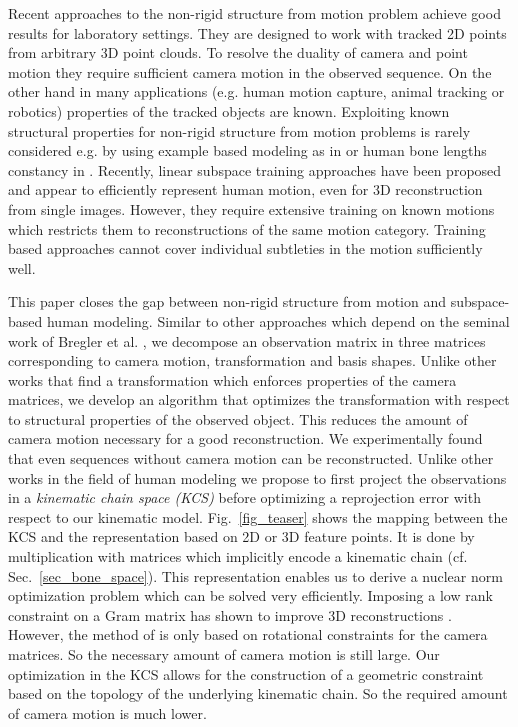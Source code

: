 \documentclass[10pt,letterpaper]{article}
\begin{document}
Recent approaches to the non-rigid structure from motion problem \cite{akhter2011trajectory,gotardo12,li12,Rehan2014} achieve good results for laboratory settings. They are designed to work with tracked 2D points from arbitrary 3D point clouds. To resolve the duality of camera and point motion they require  sufficient camera motion in the observed sequence. On the other hand in many applications (e.g. human motion capture, animal tracking or robotics) properties of the tracked objects are known. Exploiting known structural properties for non-rigid structure from motion problems is rarely considered e.g. by using example based modeling as in \cite{ChenC09} or human bone lengths constancy in \cite{Wandt2016}. Recently, linear subspace training approaches have been proposed \cite{Ramakrishna12,Wang2014,Akhter2015,ZhouConvexRelax2015,Wandt2016} and appear to efficiently represent human motion, even for 3D reconstruction from single images. However, they require extensive training on known motions which restricts them to reconstructions of the same motion category. Training based approaches cannot cover individual subtleties in the motion sufficiently well.

This paper closes the gap between non-rigid structure from motion and subspace-based human modeling. Similar to other approaches which depend on the seminal work of Bregler et al. \cite{Bregler2000}, we decompose an observation matrix in three matrices corresponding to camera motion, transformation and basis shapes. Unlike other works that find a transformation which enforces properties of the camera matrices, we develop an algorithm that optimizes the transformation with respect to structural properties of the observed object. This reduces the amount of camera motion necessary for a good reconstruction. We experimentally found that even sequences without camera motion can be reconstructed. Unlike other works in the field of human modeling we propose to first project the observations in a \textit{kinematic chain space (KCS)} before optimizing a reprojection error with respect to our kinematic model. Fig.~\ref{fig_teaser} shows the mapping between the KCS and the representation based on 2D or 3D feature points. It is done by multiplication with matrices which implicitly encode a kinematic chain (cf. Sec.~\ref{sec_bone_space}). This representation enables us to derive a nuclear norm optimization problem which can be solved very efficiently. Imposing a low rank constraint on a Gram matrix has shown to improve 3D reconstructions \cite{li12}. However, the method of \cite{li12} is only based on rotational constraints for the camera matrices. So the necessary amount of camera motion is still large. Our optimization in the KCS allows for the construction of a geometric constraint based on the topology of the underlying kinematic chain. So the required amount of camera motion is much lower.
\end{document}
